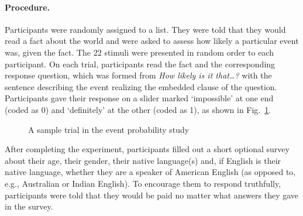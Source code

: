 \documentclass[11pt,fleqn]{article}
\newcommand{\6}{\mbox{$[\hspace*{-.6mm}[$}}
\newcommand{\9}{\mbox{$]\hspace*{-.6mm}]$}}
\newcommand{\figref}[1]{Fig.~\ref{#1}}
\begin{document}
\paragraph{Procedure.} Participants were randomly assigned to a list. They were told that they would read a fact about the world and were asked to assess how likely a particular event was, given the fact. The 22 stimuli were presented in random order to each participant. On each trial, participants read the fact and the corresponding response question, which was formed from {\em How likely is it that\ldots ?} with the sentence describing the event realizing the embedded clause of the question. Participants gave their response on a slider marked `impossible' at one end (coded as 0) and `definitely' at the other (coded as 1), as shown in \figref{f-trial-exp1}. 

\begin{figure}[h]
\begin{center}
\end{center}
\caption{A sample trial in the event probability study}\label{f-trial-exp1}
\end{figure}

After completing the experiment, participants filled out a short optional survey about their age, their gender, their native language(s) and, if English is their native language, whether they are a speaker of American English (as opposed to, e.g., Australian or Indian English). To encourage them to respond truthfully, participants were told that they would be paid no matter what answers they gave in the survey. 
\end{document}
